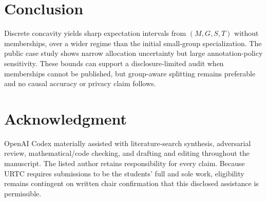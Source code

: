\documentclass[conference,10pt]{IEEEtran}
\begin{document}
\section{Conclusion}
Discrete concavity yields sharp expectation intervals from $(M,G,S,T)$ without memberships, over a wider regime than the initial small-group specialization. The public case study shows narrow allocation uncertainty but large annotation-policy sensitivity. These bounds can support a disclosure-limited audit when memberships cannot be published, but group-aware splitting remains preferable and no causal accuracy or privacy claim follows.

\section*{Acknowledgment}
OpenAI Codex materially assisted with literature-search synthesis, adversarial review, mathematical/code checking, and drafting and editing throughout the manuscript. The listed author retains responsibility for every claim. Because URTC requires submissions to be the students' full and sole work, eligibility remains contingent on written chair confirmation that this disclosed assistance is permissible.



\end{document}
